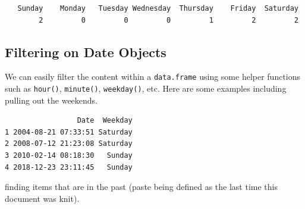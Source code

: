 \documentclass[
  letterpaper,
]{book}
\newenvironment{Shaded}{\begin{snugshade}}{\end{snugshade}}
\newcommand{\AttributeTok}[1]{\textcolor[rgb]{0.40,0.45,0.13}{#1}}
\newcommand{\ConstantTok}[1]{\textcolor[rgb]{0.56,0.35,0.01}{#1}}
\newcommand{\FunctionTok}[1]{\textcolor[rgb]{0.28,0.35,0.67}{#1}}
\newcommand{\NormalTok}[1]{\textcolor[rgb]{0.00,0.23,0.31}{#1}}
\newcommand{\OtherTok}[1]{\textcolor[rgb]{0.00,0.23,0.31}{#1}}
\newcommand{\SpecialCharTok}[1]{\textcolor[rgb]{0.37,0.37,0.37}{#1}}
\newcommand{\StringTok}[1]{\textcolor[rgb]{0.13,0.47,0.30}{#1}}
\begin{document}
\begin{Shaded}
\end{Shaded}

\begin{verbatim}
   Sunday    Monday   Tuesday Wednesday  Thursday    Friday  Saturday 
        2         0         0         0         1         2         2 
\end{verbatim}

\subsection{Filtering on Date Objects}\label{filtering-on-date-objects}

We can easily filter the content within a \texttt{data.frame} using some
helper functions such as \texttt{hour()}, \texttt{minute()},
\texttt{weekday()}, etc. Here are some examples including pulling out
the weekends.

\begin{Shaded}
\end{Shaded}

\begin{verbatim}
                 Date  Weekday
1 2004-08-21 07:33:51 Saturday
2 2008-07-12 21:23:08 Saturday
3 2010-02-14 08:18:30   Sunday
4 2018-12-23 23:11:45   Sunday
\end{verbatim}

finding items that are in the past (paste being defined as the last time
this document was knit).

\begin{Shaded}
\end{Shaded}
\end{document}
